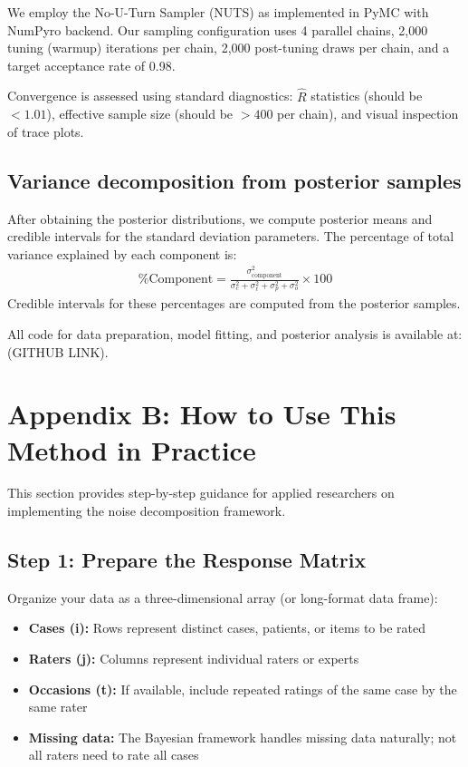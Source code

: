 \documentclass[num-refs]{wiley-article}
\begin{document}
We employ the No-U-Turn Sampler (NUTS) as implemented in PyMC with NumPyro backend. Our sampling configuration uses 4 parallel chains, 2,000 tuning (warmup) iterations per chain, 2,000 post-tuning draws per chain, and a target acceptance rate of 0.98.

Convergence is assessed using standard diagnostics: $\hat{R}$ statistics (should be $<1.01$), effective sample size (should be $>400$ per chain), and visual inspection of trace plots.

\subsection*{Variance decomposition from posterior samples}
After obtaining the posterior distributions, we compute posterior means and credible intervals for the standard deviation parameters. The percentage of total variance explained by each component is:
\begin{eqnarray*}
\text{\% Component} = \frac{\sigma^2_{\text{component}}}{\sigma^2_c + \sigma^2_\ell + \sigma^2_p + \sigma^2_o} \times 100
\end{eqnarray*}
Credible intervals for these percentages are computed from the posterior samples.

All code for data preparation, model fitting, and posterior analysis is available at: (GITHUB LINK).

\section*{Appendix B: How to Use This Method in Practice}\label{section-practical-guide}

This section provides step-by-step guidance for applied researchers on implementing the noise decomposition framework.

\subsection*{Step 1: Prepare the Response Matrix}

Organize your data as a three-dimensional array (or long-format data frame):
\begin{itemize}
    \item \textbf{Cases (i):} Rows represent distinct cases, patients, or items to be rated
    \item \textbf{Raters (j):} Columns represent individual raters or experts
    \item \textbf{Occasions (t):} If available, include repeated ratings of the same case by the same rater
    \item \textbf{Missing data:} The Bayesian framework handles missing data naturally; not all raters need to rate all cases
\end{itemize}
\end{document}
